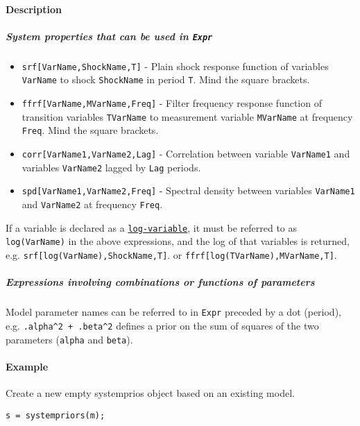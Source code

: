 \paragraph{Description}\label{description}

\subparagraph{System properties that can be used in
\texttt{Expr}}\label{system-properties-that-can-be-used-in-expr}

\begin{itemize}
\item
  \texttt{srf{[}VarName,ShockName,T{]}} - Plain shock response function
  of variables \texttt{VarName} to shock \texttt{ShockName} in period
  \texttt{T}. Mind the square brackets.
\item
  \texttt{ffrf{[}VarName,MVarName,Freq{]}} - Filter frequency response
  function of transition variables \texttt{TVarName} to measurement
  variable \texttt{MVarName} at frequency \texttt{Freq}. Mind the square
  brackets.
\item
  \texttt{corr{[}VarName1,VarName2,Lag{]}} - Correlation between
  variable \texttt{VarName1} and variables \texttt{VarName2} lagged by
  \texttt{Lag} periods.
\item
  \texttt{spd{[}VarName1,VarName2,Freq{]}} - Spectral density between
  variables \texttt{VarName1} and \texttt{VarName2} at frequency
  \texttt{Freq}.
\end{itemize}

If a variable is declared as a
\href{modellang/logvariables}{\texttt{log-variable}}, it must be
referred to as \texttt{log(VarName)} in the above expressions, and the
log of that variables is returned, e.g.
\texttt{srf{[}log(VarName),ShockName,T{]}}. or
\texttt{ffrf{[}log(TVarName),MVarName,T{]}}.

\subparagraph{Expressions involving combinations or functions of
parameters}\label{expressions-involving-combinations-or-functions-of-parameters}

Model parameter names can be referred to in \texttt{Expr} preceded by a
dot (period), e.g. \texttt{.alpha\^{}2 + .beta\^{}2} defines a prior on
the sum of squares of the two parameters (\texttt{alpha} and
\texttt{beta}).

\paragraph{Example}\label{example}

Create a new empty systemprios object based on an existing model.

\begin{verbatim}
s = systempriors(m);
\end{verbatim}

